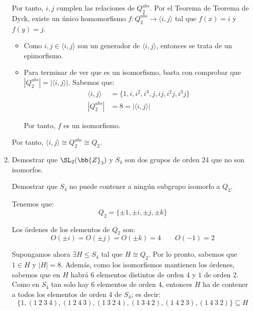 \begin{ejercicio}
\begin{enumerate}
        Por tanto, $i,j$ cumplen las relaciones de $Q_2^{abs}$. Por el Teorema de Teorema de Dyck, existe un único homomorfismo $f:Q_2^{abs}\to\langle i,j\rangle$ tal que $f(x)=i$ y $f(y)=j$.
        \begin{itemize}
            \item Como $i,j\in\langle i,j\rangle$ son un generador de $\langle i,j\rangle$, entonces se trata de un epimorfismo.
            \item Para terminar de ver que es un isomorfismo, basta con comprobar que $|Q_2^{abs}|=|\langle i,j\rangle|$. Sabemos que:
            \begin{align*}
                \langle i,j\rangle &= \{1,i,i^2,i^3,j,ij,i^2j,i^3j\}\\
                |Q_2^{abs}| &= 8 = |\langle i,j\rangle|
            \end{align*}

            Por tanto, $f$ es un isomorfismo.
        \end{itemize}
        Por tanto, $\langle i,j\rangle\cong Q_2^{abs}\cong Q_2$.
        \item Demostrar que $\SL_2(\bb{Z}_3)$ y $S_4$ son dos grupos de orden 24 que no son isomorfos.
        \begin{observacion}
            Demostrar que $S_4$ no puede contener a ningún subgrupo isomorfo a $Q_2$.
        \end{observacion}
        
        Tenemos que:
        \begin{equation*}
            Q_2 = \{\pm 1, \pm i, \pm j, \pm k\}
        \end{equation*}

        Los órdenes de los elementos de $Q_2$ son:
        \begin{equation*}
            O(\pm i)= O(\pm j)= O(\pm k)=4\qquad O(-1)=2
        \end{equation*}

        Supongamos ahora $\exists H\leq S_4$ tal que $H\cong Q_2$. Por lo pronto, sabemos que $1\in H$ y $|H|=8$.
        Además, como los isomorfismos mantienen los órdenes, sabemos que en $H$ habrá $6$ elementos distintos de orden 4 y $1$ de orden 2. Como en $S_4$ tan solo hay $6$ elementos de orden 4, entonces $H$ ha de contener a todos los elementos de orden 4 de $S_4$; es decir:
        \begin{equation*}
            \{1, (1\ 2\ 3\ 4), (1\ 2\ 4\ 3), (1\ 3\ 2\ 4), (1\ 3\ 4\ 2), (1\ 4\ 2\ 3), (1\ 4\ 3\ 2)\}\subseteq H
        \end{equation*}


\end{enumerate}
\end{ejercicio}
